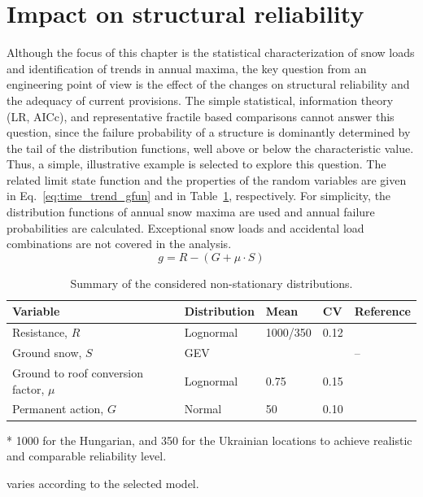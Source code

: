 \section{Impact on structural reliability}

Although the focus of this chapter is the statistical characterization of snow loads and identification of trends in annual maxima, the key question from an engineering point  of view is the effect of the changes on structural reliability and the adequacy of current provisions. The simple statistical, information theory (LR, AICc), and representative fractile based comparisons cannot answer this question, since the failure probability of a structure is dominantly determined by the tail of the distribution functions, well above or below the characteristic value. Thus, a simple, illustrative example is selected to explore this question. The related limit state function and the properties of the random variables are given in Eq.~\ref{eq:time_trend_gfun} and in Table~\ref{tab:time_trend_probmod}, respectively. For simplicity, the distribution functions of annual snow maxima are used and annual failure probabilities are calculated. Exceptional snow loads and accidental load combinations are not covered in the analysis.
\begin{equation}
\label{eq:time_trend_gfun}
	g = R - \left( {G + \mu  \cdot S } \right)
\end{equation}


\begin{table}[htbp!]
\caption{Summary of the considered non-stationary distributions.}
\centering
\label{tab:time_trend_probmod}
\small
	\begin{threeparttable}
    \begin{tabular}{lllll}
    \toprule
    Variable  & Distribution & Mean & CV & Reference \\
    \midrule
    \rowcolor{lightgrey} Resistance, $R$  & Lognormal & 1000/350\tnote{*} & 0.12  & \cite{JCSS_resi}  \\
    Ground snow, $S$ & GEV & \tnote{\textdagger} & \tnote{\textdagger}  & --  \\
    \rowcolor{lightgrey} Ground to roof conversion factor, $\mu$  & Lognormal & 0.75 & 0.15  & \cite{JCSS_load}  \\
    Permanent action, $G$  & Normal & 50 & 0.10  & \cite{JCSS_load}  \\
    \bottomrule
    \end{tabular}
    \begin{tablenotes}
    	\item[*] 1000 for the Hungarian, and 350 for the Ukrainian locations to achieve realistic and comparable reliability level.
	    \item[\textdagger] varies according to the selected model.  
   	\end{tablenotes}
   	\end{threeparttable}
\end{table}

